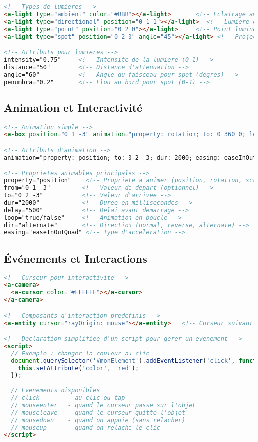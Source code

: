 \documentclass[12pt]{article}
\begin{document}
\begin{lstlisting}[language=HTML]
<!-- Types de lumieres -->
<a-light type="ambient" color="#BBB"></a-light>       <!-- Eclairage ambiant -->
<a-light type="directional" position="0 1 1"></a-light>  <!-- Lumiere directionnelle -->
<a-light type="point" position="0 2 0"></a-light>     <!-- Point lumineux -->
<a-light type="spot" position="0 2 0" angle="45"></a-light> <!-- Projecteur -->

<!-- Attributs pour lumieres -->
intensity="0.75"     <!-- Intensite de la lumiere (0-1) -->
distance="50"        <!-- Distance d'attenuation -->
angle="60"           <!-- Angle du faisceau pour spot (degres) -->
penumbra="0.2"       <!-- Flou au bord pour spot (0-1) -->
\end{lstlisting}

\subsection{Animation et Interactivité}

\begin{lstlisting}[language=HTML]
<!-- Animation simple -->
<a-box position="0 1 -3" animation="property: rotation; to: 0 360 0; loop: true; dur: 2000"></a-box>

<!-- Attributs d'animation -->
animation="property: position; to: 0 2 -3; dur: 2000; easing: easeInOutQuad; loop: true"

<!-- Proprietes animables principales -->
property="position"    <!-- Propriete a animer (position, rotation, scale, color...) -->
from="0 1 -3"         <!-- Valeur de depart (optionnel) -->
to="0 2 -3"           <!-- Valeur d'arrivee -->
dur="2000"            <!-- Duree en millisecondes -->
delay="500"           <!-- Delai avant demarrage -->
loop="true/false"     <!-- Animation en boucle -->
dir="alternate"       <!-- Direction (normal, reverse, alternate) -->
easing="easeInOutQuad" <!-- Type d'acceleration -->
\end{lstlisting}

\subsection{Événements et Interactions}

\begin{lstlisting}[language=HTML]
<!-- Curseur pour interactivite -->
<a-camera>
  <a-cursor color="#FFFFFF"></a-cursor>
</a-camera>

<!-- Composants d'interaction predefinis -->
<a-entity cursor="rayOrigin: mouse"></a-entity>   <!-- Curseur suivant la souris -->

<!-- Declaration simplifiee d'un script pour gerer un evenement -->
<script>
  // Exemple : changer la couleur au clic
  document.querySelector('#monElement').addEventListener('click', function() {
    this.setAttribute('color', 'red');
  });
  
  // Evenements disponibles
  // click        - au clic ou tap
  // mouseenter   - quand le curseur passe sur l'objet
  // mouseleave   - quand le curseur quitte l'objet
  // mousedown    - quand on appuie (sans relacher)
  // mouseup      - quand on relache le clic
</script>
\end{lstlisting}
\end{document}
